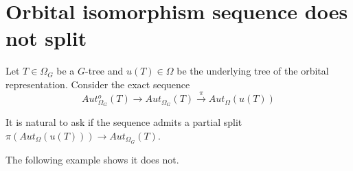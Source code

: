 \documentclass[a4paper,10pt]{article}%
\begin{document}





\section{Orbital isomorphism sequence does not split}


Let $T \in \Omega_G$
be a $G$-tree and $u(T) \in \Omega$
be the underlying tree of the orbital representation.
Consider the exact sequence
\[
Aut^o_{\Omega_G}(T)
	\to 
Aut_{\Omega_G}(T)
	\xrightarrow{\pi}
Aut_{\Omega}(u(T))	
\]

It is natural to ask if the sequence admits a partial split
$\pi 
\left(
Aut_{\Omega}(u(T))
\right)
\to
Aut_{\Omega_G}(T)
$.

The following example shows it does not.
\end{document}
